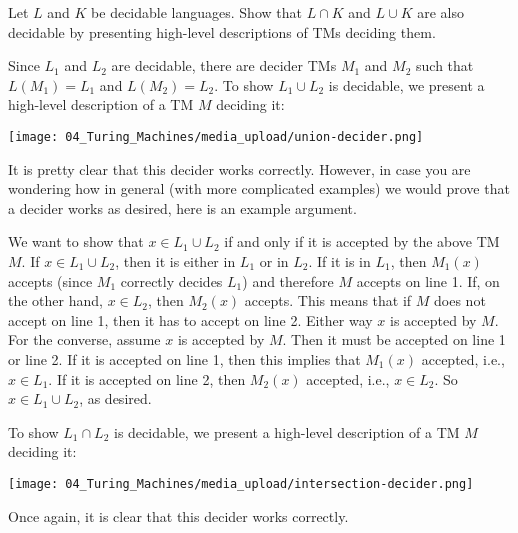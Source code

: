 \begin{flex}
\begin{exercise} \label{exercise:Decidability-is-closed-under-intersection-and-union}
Let $L$ and $K$ be decidable languages. Show that $L \cap K$ and $L \cup K$ are also decidable by presenting high-level descriptions of TMs deciding them.
\end{exercise}

\begin{solution}
Since $L_1$ and $L_2$ are decidable, there are decider TMs $M_1$ and $M_2$ such that $L(M_1) = L_1$ and $L(M_2) = L_2$. To show $L_1 \cup L_2$ is decidable, we present a high-level description of a TM $M$ deciding it:
\begin{center}
    \texttt{[image: 04\_Turing\_Machines/media\_upload/union-decider.png]}
\end{center}
It is pretty clear that this decider works correctly. However, in case you are wondering how in general (with more complicated examples) we would prove that a decider works as desired, here is an example argument.

We want to show that $x \in L_1 \cup L_2$ if and only if it is accepted by the above TM $M$. If $x \in L_1 \cup L_2$, then it is either in $L_1$ or in $L_2$. If it is in $L_1$, then $M_1(x)$ accepts (since $M_1$ correctly decides $L_1$) and therefore $M$ accepts on line 1. If, on the other hand, $x \in L_2$, then $M_2(x)$ accepts. This means that if $M$ does not accept on line 1, then it has to accept on line 2. Either way $x$ is accepted by $M$. For the converse, assume $x$ is accepted by $M$. Then it must be accepted on line 1 or line 2. If it is accepted on line 1, then this implies that $M_1(x)$ accepted, i.e., $x \in L_1$. If it is accepted on line 2, then $M_2(x)$ accepted, i.e., $x \in L_2$. So $x \in L_1 \cup L_2$, as desired.

To show $L_1 \cap L_2$ is decidable, we present a high-level description of a TM $M$ deciding it:
\begin{center}
    \texttt{[image: 04\_Turing\_Machines/media\_upload/intersection-decider.png]}
\end{center}
Once again, it is clear that this decider works correctly.
\end{solution}
\end{flex}


